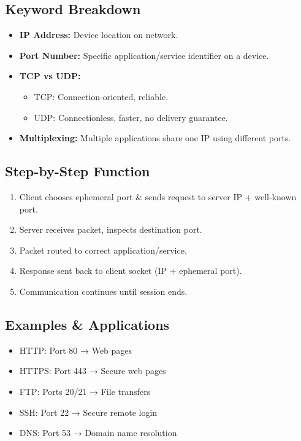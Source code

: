 \documentclass[12pt]{article}
\begin{document}
\subsection{Keyword Breakdown}
\begin{itemize}
    \item \textbf{IP Address:} Device location on network.
    \item \textbf{Port Number:} Specific application/service identifier on a device.
    \item \textbf{TCP vs UDP:}
          \begin{itemize}
              \item TCP: Connection-oriented, reliable.
              \item UDP: Connectionless, faster, no delivery guarantee.
          \end{itemize}
    \item \textbf{Multiplexing:} Multiple applications share one IP using different ports.
\end{itemize}

\subsection{Step-by-Step Function}
\begin{enumerate}
    \item Client chooses ephemeral port \& sends request to server IP + well-known port.
    \item Server receives packet, inspects destination port.
    \item Packet routed to correct application/service.
    \item Response sent back to client socket (IP + ephemeral port).
    \item Communication continues until session ends.
\end{enumerate}

\subsection{Examples \& Applications}
\begin{itemize}
    \item HTTP: Port 80 → Web pages
    \item HTTPS: Port 443 → Secure web pages
    \item FTP: Ports 20/21 → File transfers
    \item SSH: Port 22 → Secure remote login
    \item DNS: Port 53 → Domain name resolution
\end{itemize}
\end{document}
